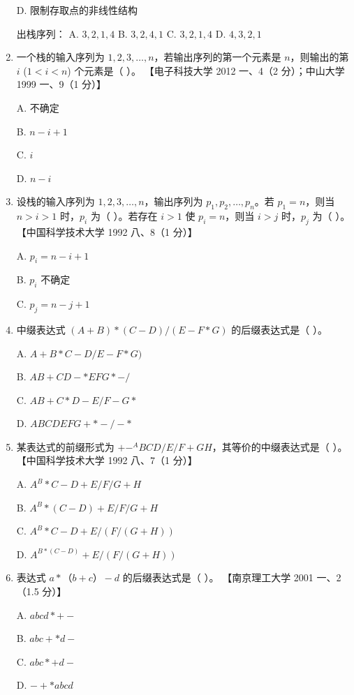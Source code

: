 \documentclass[lang=cn,newtx,10pt,scheme=chinese]{../../elegantbook}
\begin{document}
\begin{enumerate}
    D. 限制存取点的非线性结构  

    出栈序列：  
    A. $3, 2, 1, 4$ \quad B. $3, 2, 4, 1$ \quad C. $3, 2, 1, 4$ \quad D. $4, 3, 2, 1$  

    \item 一个栈的输入序列为 $1, 2, 3, \ldots, n$，若输出序列的第一个元素是 $n$，则输出的第 $i$ ($1 < i < n$) 个元素是（ ）。  
    【电子科技大学 2012 一、4（2 分）；中山大学 1999 一、9（1 分）】  

    A. 不确定  

    B. $n - i + 1$  

    C. $i$  

    D. $n-i$  

    \item 设栈的输入序列为 $1, 2, 3, \ldots, n$，输出序列为 $p_1, p_2, \ldots, p_n$。若 $p_1 = n$，则当 $n > i > 1$ 时，$p_i$ 为（ ）。若存在 $i > 1$ 使 $p_i = n$，则当 $i > j$ 时，$p_j$ 为（ ）。  
    【中国科学技术大学 1992 八、8（1 分）】  

    A. $p_i = n - i + 1$  

    B. $p_i$ 不确定  

    C. $p_j = n - j + 1$  

    \item 中缀表达式 $(A + B) * (C - D) / (E - F * G)$ 的后缀表达式是（ ）。  
   
    A. $A + B* C - D / E - F * G)$  

    B. $AB+CD-*EFG*-/$  

    C. $AB+C*D-E/F-G*$  

    D. $ABCDEFG+*-/-*$  
 

    \item 某表达式的前缀形式为 $+- ^ABCD/E/F + GH$，其等价的中缀表达式是（ ）。  
    【中国科学技术大学 1992 八、7（1 分）】  

    A. $A^B*C-D+E/F/G+H$  

    B. $A^B*(C-D) + E/F/G + H$  

    C. $A^B*C-D+E/(F/(G+H))$  

    D. $A^{B*(C-D)} +E/(F/(G+H))$  

    \item 表达式 $a*（b+c）-d$ 的后缀表达式是（ ）。  
    【南京理工大学 2001 一、2（1.5 分）】  

    A. $abcd *+-$  

    B. $abc+*d-$  

    C. $a b c * + d -$  

    D. $-+*abcd$  


\end{enumerate}
\end{document}
